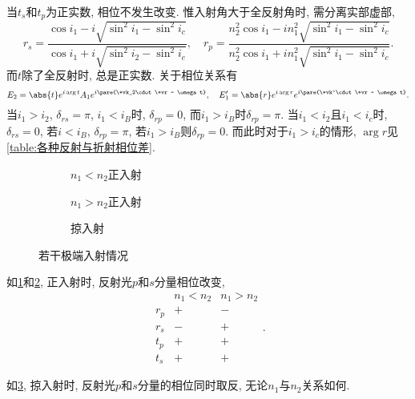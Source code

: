 \documentclass{ctexart}
\begin{document}
当$t_s$和$t_p$为正实数, 相位不发生改变. 惟入射角大于全反射角时, 需分离实部虚部,
\[ r_s  = \frac{\cos i_1 - i\sqrt{\sin^2 i_1 - \sin^2 i_c}}{\cos i_1 + i\sqrt{\sin^2 i_2 - \sin^2 i_c}},\quad r_p = \frac{n_2^2\cos i_1 - in_1^2 \sqrt{\sin^2 i_1 - \sin^2 i_c}}{n_2^2 \cos i_1 + in_1^2\sqrt{\sin^2 i_1 - \sin^2 i_c}}. \]
而$t$除了全反射时, 总是正实数. 关于相位关系有
\[ E_2 = \abs{t} e^{i\arg t} A_1 e^{i\pare{\+vk_2\cdot\+vr - \omega t}},\quad E'_1 = \abs{r}e^{i\arg r}e^{i\pare{\+vk'\cdot \+vr - \omega t}}. \]
当$i_1>i_2$, $\delta_{rs} = \pi$, $i_1<i_B$时, $\delta_{rp} = 0$, 而$i_1 > i_B$时$\delta_{rp} = \pi$. 当$i_1<i_2$且$i_1<i_c$时, $\delta_{rs} = 0$, 若$i<i_B$, $\delta_{rp} = \pi$, 若$i_1 > i_B$则$\delta_{rp} = 0$. 而此时对于$i_1>i_c$的情形, $\arg r$见\cref{table:各种反射与折射相位差}.
\begin{figure}
    \centering
    \begin{subfigure}{.47\textwidth}
        \centering
        \caption{$n_1<n_2$正入射}
        \label{fig:空气到玻璃正入射}
    \end{subfigure}
    \begin{subfigure}{.47\textwidth}
        \centering
        \caption{$n_1>n_2$正入射}
        \label{fig:玻璃到空气正入射}
    \end{subfigure}
    \begin{subfigure}{.95\textwidth}
        \centering
        \caption{掠入射}
        \label{fig:掠入射}
    \end{subfigure}
    \caption{若干极端入射情况}
    \label{fig:若干极端入射情况}
\end{figure}
\begin{sample}
    \begin{ex}
        如\cref{fig:空气到玻璃正入射}和\cref{fig:玻璃到空气正入射}, 正入射时, 反射光$p$和$s$分量相位改变,
        \[ \begin{array}{ccc}
            & n_1 < n_2 & n_1 > n_2 \\
            r_p & + & - \\
            r_s & - & + \\
            t_p & + & + \\
            t_s & + & +
        \end{array}. \]
    \end{ex}
\end{sample}
\begin{sample}
    \begin{ex}
        如\cref{fig:掠入射}, 掠入射时, 反射光$p$和$s$分量的相位同时取反, 无论$n_1$与$n_2$关系如何.
    \end{ex}
\end{sample}
\end{document}
